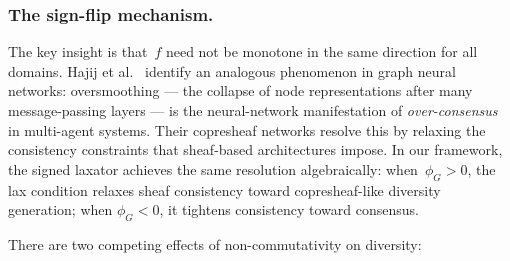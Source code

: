 \subsubsection{The sign-flip mechanism.}

The key insight is that~$f$ need not be monotone in the same direction
for all domains.  Hajij et al.~\cite{hajij2025copresheaf} identify an
analogous phenomenon in graph neural networks: oversmoothing --- the
collapse of node representations after many message-passing layers ---
is the neural-network manifestation of \emph{over-consensus} in
multi-agent systems.  Their copresheaf networks resolve this by
relaxing the consistency constraints that sheaf-based architectures
impose.  In our framework, the signed laxator achieves the same
resolution algebraically: when~$\phi_G > 0$, the lax condition relaxes
sheaf consistency toward copresheaf-like diversity generation; when
$\phi_G < 0$, it tightens consistency toward consensus.

There are two competing effects of non-commutativity
on diversity:

